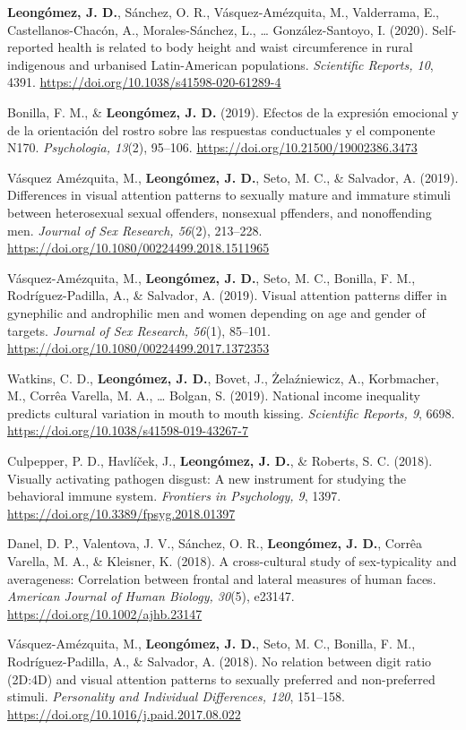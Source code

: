 \documentclass[11pt,a4paper,]{awesome-cv}
\begin{document}
\textcolor{teal}{\faStar} \textbf{Leongómez, J. D.}, Sánchez, O. R.,
Vásquez-Amézquita, M., Valderrama, E., Castellanos-Chacón, A.,
Morales-Sánchez, L., \ldots{} González-Santoyo, I. (2020). Self-reported
health is related to body height and waist circumference in rural
indigenous and urbanised Latin-American populations. \emph{Scientific
Reports, 10}, 4391. \url{https://doi.org/10.1038/s41598-020-61289-4}

\textcolor{teal}{\faStar} Bonilla, F. M., \& \textbf{Leongómez, J. D.}
(2019). Efectos de la expresión emocional y de la orientación del rostro
sobre las respuestas conductuales y el componente N170.
\emph{Psychologia, 13}(2), 95--106.
\url{https://doi.org/10.21500/19002386.3473}

Vásquez Amézquita, M., \textbf{Leongómez, J. D.}, Seto, M. C., \&
Salvador, A. (2019). Differences in visual attention patterns to
sexually mature and immature stimuli between heterosexual sexual
offenders, nonsexual pffenders, and nonoffending men. \emph{Journal of
Sex Research, 56}(2), 213--228.
\url{https://doi.org/10.1080/00224499.2018.1511965}

Vásquez-Amézquita, M., \textbf{Leongómez, J. D.}, Seto, M. C., Bonilla,
F. M., Rodríguez-Padilla, A., \& Salvador, A. (2019). Visual attention
patterns differ in gynephilic and androphilic men and women depending on
age and gender of targets. \emph{Journal of Sex Research, 56}(1),
85--101. \url{https://doi.org/10.1080/00224499.2017.1372353}

Watkins, C. D., \textbf{Leongómez, J. D.}, Bovet, J., Żelaźniewicz, A.,
Korbmacher, M., Corrêa Varella, M. A., \ldots{} Bolgan, S. (2019).
National income inequality predicts cultural variation in mouth to mouth
kissing. \emph{Scientific Reports, 9}, 6698.
\url{https://doi.org/10.1038/s41598-019-43267-7}

Culpepper, P. D., Havlíček, J., \textbf{Leongómez, J. D.}, \& Roberts,
S. C. (2018). Visually activating pathogen disgust: A new instrument for
studying the behavioral immune system. \emph{Frontiers in Psychology,
9}, 1397. \url{https://doi.org/10.3389/fpsyg.2018.01397}

Danel, D. P., Valentova, J. V., Sánchez, O. R., \textbf{Leongómez, J.
D.}, Corrêa Varella, M. A., \& Kleisner, K. (2018). A cross-cultural
study of sex-typicality and averageness: Correlation between frontal and
lateral measures of human faces. \emph{American Journal of Human
Biology, 30}(5), e23147. \url{https://doi.org/10.1002/ajhb.23147}

Vásquez-Amézquita, M., \textbf{Leongómez, J. D.}, Seto, M. C., Bonilla,
F. M., Rodríguez-Padilla, A., \& Salvador, A. (2018). No relation
between digit ratio (2D:4D) and visual attention patterns to sexually
preferred and non-preferred stimuli. \emph{Personality and Individual
Differences, 120}, 151--158.
\url{https://doi.org/10.1016/j.paid.2017.08.022}
\end{document}
